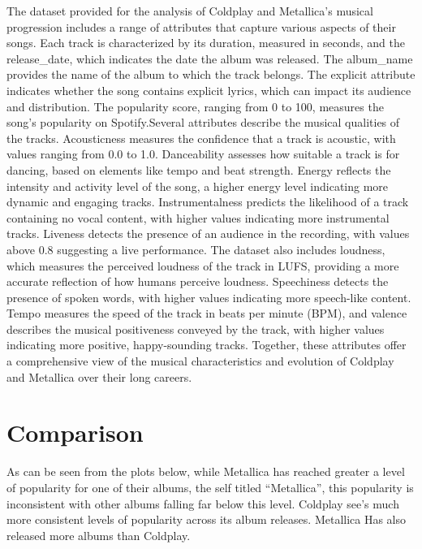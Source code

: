 \documentclass[11pt,preprint, authoryear]{elsarticle}
\numberwithin{equation}{section}
\numberwithin{figure}{section}
\numberwithin{table}{section}
\begin{document}
The dataset provided for the analysis of Coldplay and Metallica's
musical progression includes a range of attributes that capture various
aspects of their songs. Each track is characterized by its duration,
measured in seconds, and the release\_date, which indicates the date the
album was released. The album\_name provides the name of the album to
which the track belongs. The explicit attribute indicates whether the
song contains explicit lyrics, which can impact its audience and
distribution. The popularity score, ranging from 0 to 100, measures the
song's popularity on Spotify.Several attributes describe the musical
qualities of the tracks. Acousticness measures the confidence that a
track is acoustic, with values ranging from 0.0 to 1.0. Danceability
assesses how suitable a track is for dancing, based on elements like
tempo and beat strength. Energy reflects the intensity and activity
level of the song, a higher energy level indicating more dynamic and
engaging tracks. Instrumentalness predicts the likelihood of a track
containing no vocal content, with higher values indicating more
instrumental tracks. Liveness detects the presence of an audience in the
recording, with values above 0.8 suggesting a live performance. The
dataset also includes loudness, which measures the perceived loudness of
the track in LUFS, providing a more accurate reflection of how humans
perceive loudness. Speechiness detects the presence of spoken words,
with higher values indicating more speech-like content. Tempo measures
the speed of the track in beats per minute (BPM), and valence describes
the musical positiveness conveyed by the track, with higher values
indicating more positive, happy-sounding tracks. Together, these
attributes offer a comprehensive view of the musical characteristics and
evolution of Coldplay and Metallica over their long careers.

\section{Comparison}\label{comparison}

As can be seen from the plots below, while Metallica has reached greater
a level of popularity for one of their albums, the self titled
``Metallica'', this popularity is inconsistent with other albums falling
far below this level. Coldplay see's much more consistent levels of
popularity across its album releases. Metallica Has also released more
albums than Coldplay.
\end{document}
